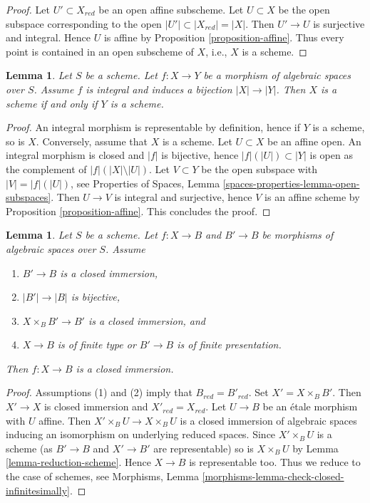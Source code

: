 \documentclass{stacks-project}
\theoremstyle{plain}
\newtheorem{lemma}[subsection]{Lemma}
\theoremstyle{definition}
\theoremstyle{remark}
\numberwithin{equation}{subsection}
\begin{document}
\begin{proof}
Let $U' \subset X_{red}$ be an open affine subscheme.
Let $U \subset X$ be the open subspace corresponding to the open
$|U'| \subset |X_{red}| = |X|$. Then $U' \to U$ is surjective and
integral. Hence $U$ is affine by
Proposition \ref{proposition-affine}.
Thus every point is contained in an open subscheme of $X$, i.e.,
$X$ is a scheme.
\end{proof}

\begin{lemma}
\label{lemma-integral-universally-bijective-scheme}
Let $S$ be a scheme. Let $f : X \to Y$ be a morphism of algebraic spaces
over $S$. Assume $f$ is integral and induces a bijection $|X| \to |Y|$.
Then $X$ is a scheme if and only if $Y$ is a scheme.
\end{lemma}

\begin{proof}
An integral morphism is representable by definition, hence if $Y$
is a scheme, so is $X$. Conversely, assume that $X$ is a scheme.
Let $U \subset X$ be an affine open. An integral morphism is
closed and $|f|$ is bijective, hence $|f|(|U|) \subset |Y|$
is open as the complement of $|f|(|X| \setminus |U|)$. Let
$V \subset Y$ be the open subspace with $|V| = |f|(|U|)$, see
Properties of Spaces, Lemma \ref{spaces-properties-lemma-open-subspaces}.
Then $U \to V$ is integral and surjective, hence
$V$ is an affine scheme by Proposition \ref{proposition-affine}.
This concludes the proof.
\end{proof}

\begin{lemma}
\label{lemma-check-closed-infinitesimally}
Let $S$ be a scheme.
Let $f : X \to B$ and $B' \to B$ be morphisms of algebraic spaces over $S$.
Assume
\begin{enumerate}
\item $B' \to B$ is a closed immersion,
\item $|B'| \to |B|$ is bijective,
\item $X \times_B B' \to B'$ is a closed immersion, and
\item $X \to B$ is of finite type or $B' \to B$ is of finite presentation.
\end{enumerate}
Then $f : X \to B$ is a closed immersion.
\end{lemma}

\begin{proof}
Assumptions (1) and (2) imply that $B_{red} = B'_{red}$.
Set $X' = X \times_B B'$. Then $X' \to X$ is closed immersion
and $X'_{red} = X_{red}$. Let $U \to B$ be an \'etale morphism
with $U$ affine. Then $X' \times_B U \to X \times_B U$ is a
closed immersion of algebraic spaces inducing an isomorphism
on underlying reduced spaces. Since $X' \times_B U$ is a scheme
(as $B' \to B$ and $X' \to B'$ are representable) so is
$X \times_B U$ by Lemma \ref{lemma-reduction-scheme}.
Hence $X \to B$ is representable too. Thus we reduce to the
case of schemes, see
Morphisms, Lemma \ref{morphisms-lemma-check-closed-infinitesimally}.
\end{proof}
\end{document}
